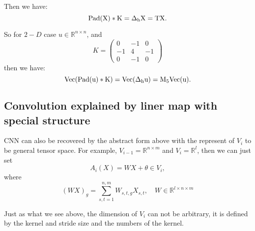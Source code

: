 Then we have:
\begin{equation}
\rm{Pad}(X) \ast K = \Delta_h X = T X.
\end{equation}

So for $2-D$ case $u \in \mathbb{R}^{n \times n}$, and 
\begin{equation}
K = 
\begin{pmatrix}
0 & -1 & 0 \\
-1 & 4 & -1 \\
0 & -1 & 0 
\end{pmatrix}
\end{equation}
then we have: 
\begin{equation}
\rm{Vec}(\rm{Pad}(u) \ast K ) = \rm{Vec}(\Delta_h u) = M_5 \rm{Vec}(u).
\end{equation}


\subsection{Convolution explained by liner map with special structure}
CNN can also be recovered by the abstract form above with the represent of $V_i$ to be general tensor space. For example, $V_{i-1} = \mathbb{R}^{n \times m}$ and $V_i = \mathbb{R}^{l}$, then we can just set 
\begin{equation}
A_i(X) = WX + \theta \in V_i,
\end{equation}
where
\begin{equation}
(WX)_{g} = \sum_{s,t=1}^{n,m}W_{s,t,g}X_{s,t}, \quad W \in \mathbb{R}^{l \times n \times m}
\end{equation}

Just as what we see above, the dimension of $V_i$ can not be arbitrary, it is defined by the kernel and stride size and the numbers of the kernel. 

